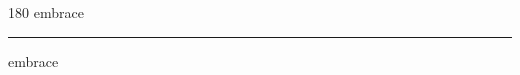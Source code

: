 
\begin{frame}
\begin{center}
\begin{turn}{180}
{\fontsize{2.5cm}{1em}\selectfont embrace}
\end{turn}
\vspace{1em}\par  
\hrule
\vspace{1em}\par  
{\fontsize{2.5cm}{1em}\selectfont embrace}
\end{center}
\end{frame}
